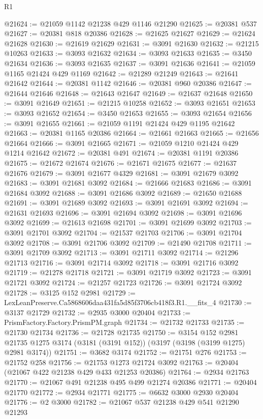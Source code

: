 \begin{lexlean}{R1}
\begin{coremodule}
@21624 := @21059 @1142 @21238 @429 @1146 @21290
@21625 := @20381 @537
@21627 := @20381 @818 @20386
@21628 := @21625 @21627
@21629 := @21624 @21628
@21630 := @21619 @21629
@21631 := @3091 @21630
@21632 := @21215 @10263
@21633 := @3093 @21632
@21634 := @3093 @21633
@21635 := @3450 @21634
@21636 := @3093 @21635
@21637 := @3091 @21636
@21641 := @21059 @1165 @21424 @429 @1169
@21642 := @21289 @21249
@21643 := @21641 @21642
@21644 := @20381 @1142
@21646 := @20381 @960 @20386
@21647 := @21644 @21646
@21648 := @21643 @21647
@21649 := @21637 @21648
@21650 := @3091 @21649
@21651 := @21215 @10258
@21652 := @3093 @21651
@21653 := @3093 @21652
@21654 := @3450 @21653
@21655 := @3093 @21654
@21656 := @3091 @21655
@21661 := @21059 @1191 @21424 @429 @1195 @21642
@21663 := @20381 @1165 @20386
@21664 := @21661 @21663
@21665 := @21656 @21664
@21666 := @3091 @21665
@21671 := @21059 @1210 @21424 @429 @1214 @21642
@21672 := @20381 @491
@21674 := @20381 @1191 @20386
@21675 := @21672 @21674
@21676 := @21671 @21675
@21677 := @21637 @21676
@21679 := @3091 @21677 @4329
@21681 := @3091 @21679 @3092
@21683 := @3091 @21681 @3092
@21684 := @21666 @21683
@21686 := @3091 @21684 @3092
@21688 := @3091 @21686 @3092
@21689 := @21650 @21688
@21691 := @3091 @21689 @3092
@21693 := @3091 @21691 @3092
@21694 := @21631 @21693
@21696 := @3091 @21694 @3092
@21698 := @3091 @21696 @3092
@21699 := @21613 @21698
@21701 := @3091 @21699 @3092
@21703 := @3091 @21701 @3092
@21704 := @21537 @21703
@21706 := @3091 @21704 @3092
@21708 := @3091 @21706 @3092
@21709 := @21490 @21708
@21711 := @3091 @21709 @3092
@21713 := @3091 @21711 @3092
@21714 := @21296 @21713
@21716 := @3091 @21714 @3092
@21718 := @3091 @21716 @3092
@21719 := @21278 @21718
@21721 := @3091 @21719 @3092
@21723 := @3091 @21721 @3092
@21724 := @21257 @21723
@21726 := @3091 @21724 @3092
@21728 := @3125 @152 @2981
@21729 := LexLeanPreserve.Ca5868606daa431fa5d85f3706cb418f3.R1.__fits_4
@21730 := @3137 @21729
@21732 := @2935 @3000 @20404
@21733 := PrismFactory.Factory.PrismPM.graph
@21734 := @21732 @21733
@21735 := @21730 @21734
@21736 := @21728 @21735
@21750 := @3154
    @152
    @2981
    @21735
    @1275
    @3174
    (@3181 (@3191 @152))
    (@3197 (@3198 (@3199 @1275) @2981 @3174))
@21751 := @3682 @3174
@21752 := @21751 @276
@21753 := @21752 @258
@21756 := @21753 @1273 @21724 @3092
@21763 := @20404 (@21067 @422 @21238 @429 @433 @21253 @20386)
@21764 := @2934 @21763
@21770 := @21067 @491 @21238 @495 @499 @21274 @20386
@21771 := @20404 @21770
@21772 := @2934 @21771
@21775 := @6632 @3000 @2930 @20404
@21776 := @2 @3000
@21782 := @21067 @537 @21238 @429 @541 @21290 @21293

\end{coremodule}
\end{lexlean}
